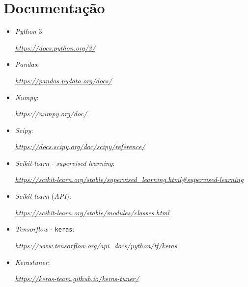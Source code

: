 \documentclass[a4paper]{report}
\begin{document}
\chapter{Documentação} \label{ch:Documentation}
\begin{itemize}
    \item \textit{Python} 3:
	\par \textit{\url{https://docs.python.org/3/}}
	\item \textit{Pandas}:
	\par \textit{\url{https://pandas.pydata.org/docs/}}
	\item \textit{Numpy}:
	\par \textit{\url{https://numpy.org/doc/}}
	\item \textit{Scipy}:
	\par \textit{\url{https://docs.scipy.org/doc/scipy/reference/}}
	\item \textit{Scikit-learn} - \textit{supervised learning}:
	\sloppy
	\par \textit{\url{https://scikit-learn.org/stable/supervised_learning.html\#supervised-learning}}
	\item \textit{Scikit-learn} (\textsl{API}):
    \par \textit{\url{https://scikit-learn.org/stable/modules/classes.html}}
	\item \textit{Tensorflow} - \texttt{keras}:
	\par \textit{\url{https://www.tensorflow.org/api_docs/python/tf/keras}}
	\item \textit{Kerastuner}:
	\par \textit{\url{https://keras-team.github.io/keras-tuner/}}
\end{itemize}
\end{document}
